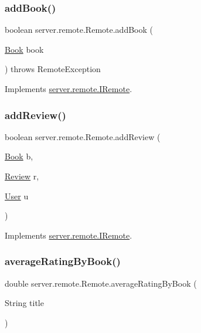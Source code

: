 \subsubsection{\texorpdfstring{add\+Book()}{addBook()}}
{\footnotesize\ttfamily boolean server.\+remote.\+Remote.\+add\+Book (\begin{DoxyParamCaption}\item[{\hyperlink{classserver_1_1data_1_1_book}{Book}}]{book }\end{DoxyParamCaption}) throws Remote\+Exception}



Implements \hyperlink{interfaceserver_1_1remote_1_1_i_remote_a3b11a0e182873e445ec8546394e36373}{server.\+remote.\+I\+Remote}.

\mbox{\label{classserver_1_1remote_1_1_remote_af94163cf6d5c40cfc880eb517d56aa48}} 
\subsubsection{\texorpdfstring{add\+Review()}{addReview()}}
{\footnotesize\ttfamily boolean server.\+remote.\+Remote.\+add\+Review (\begin{DoxyParamCaption}\item[{\hyperlink{classserver_1_1data_1_1_book}{Book}}]{b,  }\item[{\hyperlink{classserver_1_1data_1_1_review}{Review}}]{r,  }\item[{\hyperlink{classserver_1_1data_1_1_user}{User}}]{u }\end{DoxyParamCaption})}



Implements \hyperlink{interfaceserver_1_1remote_1_1_i_remote_ab24486281e8c228ee82a48a5ca70297b}{server.\+remote.\+I\+Remote}.

\mbox{\label{classserver_1_1remote_1_1_remote_afd253ddc199a34a1e05317878f957cc9}} 
\subsubsection{\texorpdfstring{average\+Rating\+By\+Book()}{averageRatingByBook()}}
{\footnotesize\ttfamily double server.\+remote.\+Remote.\+average\+Rating\+By\+Book (\begin{DoxyParamCaption}\item[{String}]{title }\end{DoxyParamCaption})}



